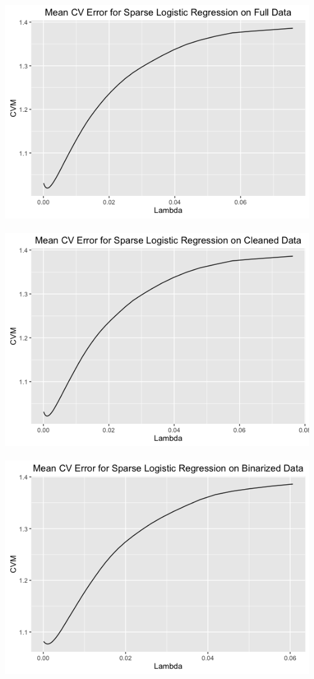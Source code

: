 \documentclass{article}
\begin{document}
\centerline{\includegraphics[scale=.25]{diagrams/1logreg.png} ~~~ \includegraphics[scale=.25]{diagrams/2logreg.png} ~~~ \includegraphics[scale=.25]{diagrams/3logreg.png}}
\end{document}
